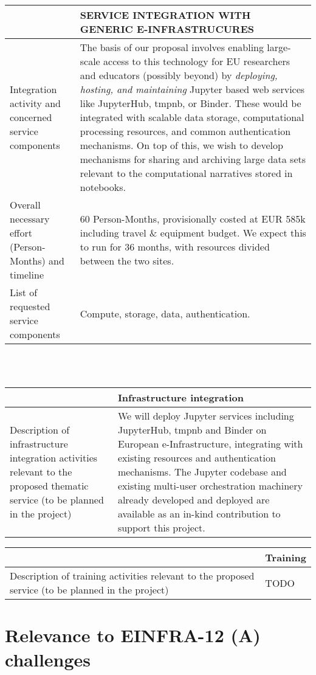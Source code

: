 \begin{tabular}{|p{7cm}|p{7cm}|}
&SERVICE INTEGRATION WITH GENERIC E-INFRASTRUCURES
\\\hline
Integration activity and concerned service components&The basis of our proposal involves
enabling large-scale access to this technology for EU researchers and educators
(possibly beyond) by \emph{deploying, hosting, and maintaining} Jupyter
based web services like JupyterHub, tmpnb, or Binder. These would be integrated
with scalable data storage, computational processing resources, and common
authentication mechanisms. On top of this, we wish to develop mechanisms for sharing
and archiving large data sets relevant to the computational narratives stored in
notebooks.
\\\hline
Overall necessary effort (Person-Months) and timeline&60 Person-Months,
provisionally costed at EUR 585k including travel \& equipment budget.
We expect this to run for 36 months, with resources divided between the two
sites.
\\\hline
List of requested service components&Compute, storage, data, authentication.
\\\hline
\end{tabular}
\\\\
\begin{tabular}{|p{7cm}|p{7cm}|}
&Infrastructure integration
\\\hline
Description of infrastructure integration activities relevant to the proposed
thematic service (to be planned in the project)&
We will deploy Jupyter services including JupyterHub, tmpnb and Binder on European
e-Infrastructure, integrating with existing resources and authentication
mechanisms. The Jupyter codebase and existing multi-user orchestration machinery
already developed and deployed are available as an in-kind contribution to
support this project.
\\\hline
\end{tabular}

\begin{tabular}{|p{7cm}|l|}
&Training
\\\hline
Description of training activities relevant to the proposed service (to be planned in the project)&TODO
\\\hline
\end{tabular}

\section{Relevance to EINFRA-12 (A) challenges}

